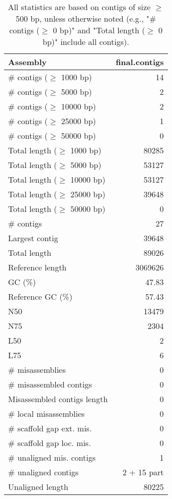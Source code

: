 \documentclass[12pt,a4paper]{article}
\begin{document}
\begin{table}[ht]
\begin{center}
\caption{All statistics are based on contigs of size $\geq$ 500 bp, unless otherwise noted (e.g., "\# contigs ($\geq$ 0 bp)" and "Total length ($\geq$ 0 bp)" include all contigs).}
\begin{tabular}{|l*{1}{|r}|}
\hline
Assembly & final.contigs \\ \hline
\# contigs ($\geq$ 1000 bp) & 14 \\ \hline
\# contigs ($\geq$ 5000 bp) & 2 \\ \hline
\# contigs ($\geq$ 10000 bp) & 2 \\ \hline
\# contigs ($\geq$ 25000 bp) & 1 \\ \hline
\# contigs ($\geq$ 50000 bp) & 0 \\ \hline
Total length ($\geq$ 1000 bp) & 80285 \\ \hline
Total length ($\geq$ 5000 bp) & 53127 \\ \hline
Total length ($\geq$ 10000 bp) & 53127 \\ \hline
Total length ($\geq$ 25000 bp) & 39648 \\ \hline
Total length ($\geq$ 50000 bp) & 0 \\ \hline
\# contigs & 27 \\ \hline
Largest contig & 39648 \\ \hline
Total length & 89026 \\ \hline
Reference length & 3069626 \\ \hline
GC (\%) & 47.83 \\ \hline
Reference GC (\%) & 57.43 \\ \hline
N50 & 13479 \\ \hline
N75 & 2304 \\ \hline
L50 & 2 \\ \hline
L75 & 6 \\ \hline
\# misassemblies & 0 \\ \hline
\# misassembled contigs & 0 \\ \hline
Misassembled contigs length & 0 \\ \hline
\# local misassemblies & 0 \\ \hline
\# scaffold gap ext. mis. & 0 \\ \hline
\# scaffold gap loc. mis. & 0 \\ \hline
\# unaligned mis. contigs & 1 \\ \hline
\# unaligned contigs & 2 + 15 part \\ \hline
Unaligned length & 80225 \\ \hline

\end{tabular}
\end{center}
\end{table}
\end{document}
